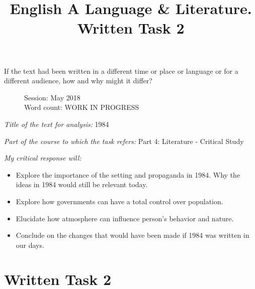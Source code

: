 \documentclass[a4paper,12pt]{article}
\title{English A Language \& Literature. Written Task 2}
\date{}
\author{}
\begin{document}
\maketitle
\begin{center}
If the text had been written in a different time or place or language or for a different audience, how and why might it differ?
\end{center}
\begin{flushleft}
\begin{figure}
Session: May 2018\\
Word count: WORK IN PROGRESS\\
\end{figure}
\end{flushleft}
\newpage

\textit{Title of the text for analysis:} 1984

\textit{Part of the course to which the task refers:} Part 4: Literature - Critical Study 

\textit{My critical response will:}

\begin{itemize}

\item Explore the importance of the setting and propaganda in 1984. Why the ideas in 1984 would still be relevant today.

  \item Explore how governments can have a total control over population.

  \item Elucidate how atmosphere can influence person's behavior and nature.

  \item Conclude on the changes that would have been made if 1984 was written in our days.
    
  \end{itemize}

\section*{Written Task 2}
\end{document}
